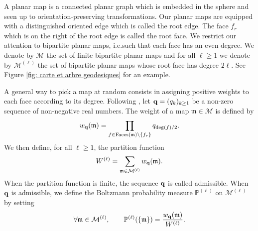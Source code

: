 \documentclass[11pt]{article}
\numberwithin{equation}{section}
\def\P{\mathbb{P}}
\begin{document}
A planar map is a connected planar graph which is embedded in the sphere and seen up to orientation-preserving transformations. Our planar maps are equipped with a distinguished oriented edge which is called the root edge. The face $f_r$ which is on the right of the root edge is called the root face. We restrict our attention to bipartite planar maps, i.e.\@ such that each face has an even degree. We denote by $\mathcal{M}$ the set of finite bipartite planar maps and for all $\ell \ge1$ we denote by $\mathcal{M}^{(\ell)}$ the set of bipartite planar maps whose root face has degree $2\ell$. See Figure \ref{fig: carte et arbre geodesiques} for an example.

A general way to pick a map at random consists in assigning positive weights to each face according to its degree. Following \cite{MM07}, let ${\bf q} = (q_k)_{k\ge 1}$ be a non-zero sequence of non-negative real numbers. The weight of a map $\mathfrak{m} \in \mathcal{M}$ is defined by
$$
w_{\bf q}(\mathfrak{m}) = \prod_{f \in \mathrm{Faces}(\mathfrak{m}) \setminus \{f_r\}} q_{\deg (f)/2}.
$$
We then define, {for all $\ell \ge 1$,} the partition function 
$$
W^{(\ell)} = \sum_{\mathfrak{m} \in \mathcal{M}^{(\ell)}} w_{\bf q} (\mathfrak{m}).
$$
When the partition function is finite, the sequence $\bf q$ is called admissible. When ${\bf q}$ is admissible, we define the Boltzmann probability measure $\P^{(\ell)}$ on $\mathcal{M}^{(\ell)}$ by setting
$$
\forall \mathfrak{m} \in \mathcal{M}^{(\ell)}, \qquad \P^{(\ell)}(\{\mathfrak{m}\}) = 
\frac{w_{\bf q} (\mathfrak{m})}{W^{(\ell)}}.
$$
\end{document}
